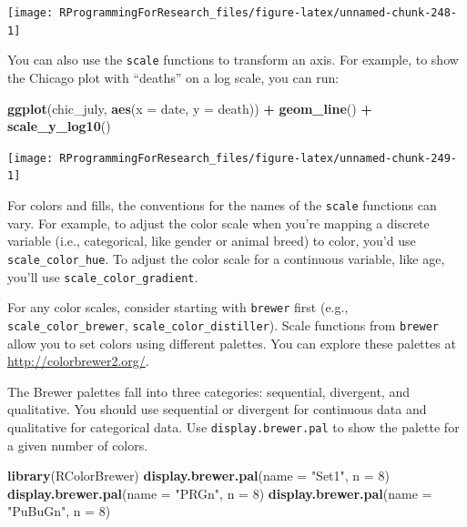 \documentclass[]{book}
\makeatletter
\newenvironment{Shaded}{\begin{snugshade}}{\end{snugshade}}
\newcommand{\KeywordTok}[1]{\textcolor[rgb]{0.13,0.29,0.53}{\textbf{#1}}}
\newcommand{\DataTypeTok}[1]{\textcolor[rgb]{0.13,0.29,0.53}{#1}}
\newcommand{\DecValTok}[1]{\textcolor[rgb]{0.00,0.00,0.81}{#1}}
\newcommand{\StringTok}[1]{\textcolor[rgb]{0.31,0.60,0.02}{#1}}
\newcommand{\OperatorTok}[1]{\textcolor[rgb]{0.81,0.36,0.00}{\textbf{#1}}}
\newcommand{\NormalTok}[1]{#1}
\newenvironment{kframe}{%
\medskip{}
\setlength{\fboxsep}{.8em}
 \def\at@end@of@kframe{}%
 \ifinner\ifhmode%
  \def\at@end@of@kframe{\end{minipage}}%
  \begin{minipage}{\columnwidth}%
 \fi\fi%
 \def\FrameCommand##1{\hskip\@totalleftmargin \hskip-\fboxsep
 \colorbox{shadecolor}{##1}\hskip-\fboxsep
     \hskip-\linewidth \hskip-\@totalleftmargin \hskip\columnwidth}%
 \MakeFramed {\advance\hsize-\width
   \@totalleftmargin\z@ \linewidth\hsize
   \@setminipage}}%
 {\par\unskip\endMakeFramed%
 \at@end@of@kframe}
\renewenvironment{Shaded}{\begin{kframe}}{\end{kframe}}
\theoremstyle{definition}
\theoremstyle{definition}
\theoremstyle{definition}
\theoremstyle{remark}
\makeatother
\begin{document}
\begin{center}\texttt{[image: RProgrammingForResearch\_files/figure-latex/unnamed-chunk-248-1]} \end{center}

You can also use the \texttt{scale} functions to transform an axis. For
example, to show the Chicago plot with ``deaths'' on a log scale, you
can run:

\begin{Shaded}
\begin{Highlighting}[]
\KeywordTok{ggplot}\NormalTok{(chic_july, }\KeywordTok{aes}\NormalTok{(}\DataTypeTok{x =}\NormalTok{ date, }\DataTypeTok{y =}\NormalTok{ death)) }\OperatorTok{+}\StringTok{ }
\StringTok{  }\KeywordTok{geom_line}\NormalTok{() }\OperatorTok{+}
\StringTok{  }\KeywordTok{scale_y_log10}\NormalTok{()}
\end{Highlighting}
\end{Shaded}

\begin{center}\texttt{[image: RProgrammingForResearch\_files/figure-latex/unnamed-chunk-249-1]} \end{center}

For colors and fills, the conventions for the names of the
\texttt{scale} functions can vary. For example, to adjust the color
scale when you're mapping a discrete variable (i.e., categorical, like
gender or animal breed) to color, you'd use \texttt{scale\_color\_hue}.
To adjust the color scale for a continuous variable, like age, you'll
use \texttt{scale\_color\_gradient}.

For any color scales, consider starting with \texttt{brewer} first
(e.g., \texttt{scale\_color\_brewer}, \texttt{scale\_color\_distiller}).
Scale functions from \texttt{brewer} allow you to set colors using
different palettes. You can explore these palettes at
\url{http://colorbrewer2.org/}.

The Brewer palettes fall into three categories: sequential, divergent,
and qualitative. You should use sequential or divergent for continuous
data and qualitative for categorical data. Use
\texttt{display.brewer.pal} to show the palette for a given number of
colors.

\begin{Shaded}
\begin{Highlighting}[]
\KeywordTok{library}\NormalTok{(RColorBrewer)}
\KeywordTok{display.brewer.pal}\NormalTok{(}\DataTypeTok{name =} \StringTok{"Set1"}\NormalTok{, }\DataTypeTok{n =} \DecValTok{8}\NormalTok{)}
\KeywordTok{display.brewer.pal}\NormalTok{(}\DataTypeTok{name =} \StringTok{"PRGn"}\NormalTok{, }\DataTypeTok{n =} \DecValTok{8}\NormalTok{)}
\KeywordTok{display.brewer.pal}\NormalTok{(}\DataTypeTok{name =} \StringTok{"PuBuGn"}\NormalTok{, }\DataTypeTok{n =} \DecValTok{8}\NormalTok{)}
\end{Highlighting}
\end{Shaded}
\end{document}
